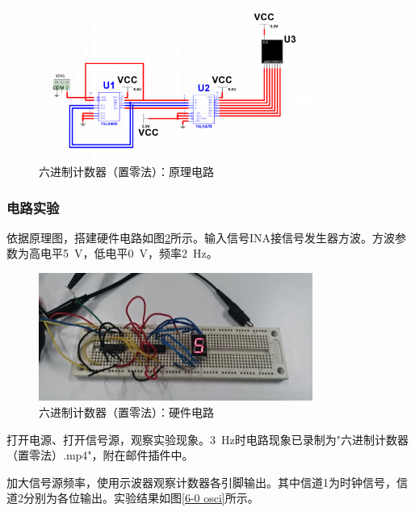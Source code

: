 \documentclass[UTF8]{ctexart}
\numberwithin{figure}{subsection}
\numberwithin{table}{subsection}
\numberwithin{equation}{subsection}
\begin{document}
\begin{figure}[H]
    \begin{center}
        \includegraphics[width=0.8\textwidth]{design/6-0 circuit.png}
    \end{center}
    \caption{六进制计数器（置零法）：原理电路}
    \label{6-0 theory cir}
\end{figure}

\subsubsection{电路实验}
\par 依据原理图，搭建硬件电路如图\ref{6 cir}所示。输入信号INA接信号发生器方波。方波参数为高电平\SI{5}{\volt}，低电平\SI{0}{\volt}，频率\SI{2}{\hertz}。

\begin{figure}[H]
    \begin{center}
        \includegraphics[width=0.8\textwidth]{6-0/circuit.jpg}
    \end{center}
    \caption{六进制计数器（置零法）：硬件电路}
    \label{6 cir}
\end{figure}

\par 打开电源、打开信号源，观察实验现象。\SI{3}{\hertz}时电路现象已录制为"六进制计数器（置零法）.mp4"，附在邮件插件中。
\par 加大信号源频率，使用示波器观察计数器各引脚输出。其中信道1为时钟信号，信道2分别为各位输出。实验结果如图\ref{6-0 osci}所示。
\end{document}
